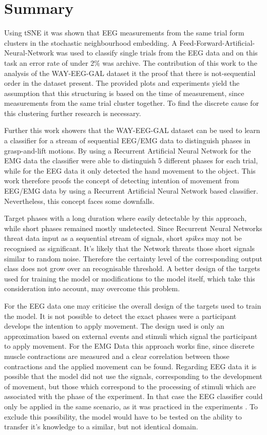 \documentclass{article} %
\begin{document}
\section{Summary}
Using tSNE it was shown that EEG measurements from the same trial form clusters in the stochastic neighbourhood embedding.
A Feed-Forward-Artificial-Neural-Network was used to classify single trials from the EEG data and on this task an error rate of under 2\% was archive.
The contribution of this work to the analysis of the WAY-EEG-GAL dataset it the proof that there is not-sequential order in the dataset present.
The provided plots and experiments yield the assumption that this structuring is based on the time of measurement, since measurements from the same trial cluster together.
To find the discrete cause for this clustering further research is necessary.

Further this work showers that the WAY-EEG-GAL dataset can be used to learn a classifier for a stream of sequential EEG/EMG data to distinguish phases in grasp-and-lift motions.
By using a Recurrent Artificial Neural Network for the EMG data the classifier were able to distinguish 5 different phases for each trial,
while for the EEG data it only detected the hand movement to the object.
This work therefore proofs the concept of detecting intention of movement from EEG/EMG data by using a Recurrent Artificial Neural Network based classifier.
Nevertheless, this concept faces some downfalls.

Target phases with a long duration where easily detectable by this approach, while short phases remained mostly undetected.
Since Recurrent Neural Networks threat data input as a sequential stream of signals, short \textit{spikes} may not be recognised as significant.
It's likely that the Network threats those short signals similar to random noise.
Therefore the certainty level of the corresponding output class does not grow over an recognisable threshold. 
A better design of the targets used for training the model or modifications to the model itself, which take this consideration into account, may overcome this problem.

For the EEG data one may criticise the overall design of the targets used to train the model.
It is not possible to detect the exact phases were a participant develops the intention to apply movement.
The design used is only an approximation based on external events and stimuli which signal the participant to apply movement.
For the EMG Data this approach works fine, since discrete muscle contractions are measured and a clear correlation between those contractions and the applied movement can be found.
Regarding EEG data it is possible that the model did not use the signals, corresponding to the development of movement, but those which correspond to the processing of stimuli which are associated with the phase of the experiment.
In that case the EEG classifier could only be applied in the same scenario, as it was practiced in the experiments \cite{nature}.
To exclude this possibility, the model would have to be tested on the ability to transfer it's knowledge to a similar, but not identical domain.
\end{document}

